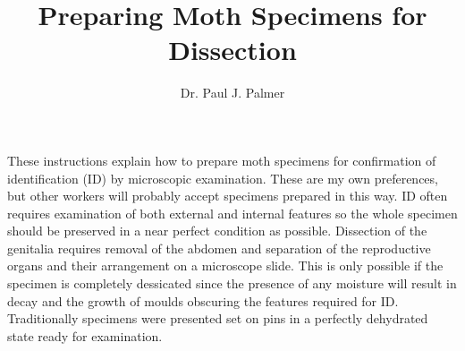 \documentclass[]{article}
\title{Preparing Moth Specimens for Dissection}
\author{Dr. Paul J. Palmer}
\begin{document}
{}
%


%	

These instructions explain how to prepare moth specimens for confirmation of  identification (ID) by microscopic examination. These are my own preferences, but other workers will probably accept specimens prepared in this way. ID often requires examination of both external and internal features so the whole specimen should be preserved in a near perfect condition as possible. Dissection of the genitalia requires removal of the abdomen and separation of the reproductive organs and their arrangement on a microscope slide. This is only possible if the specimen is completely dessicated since the presence of any moisture will result in decay and the growth of moulds obscuring the features required for ID. Traditionally specimens were presented set on pins in a perfectly dehydrated state ready for examination. 


%	
\end{document}
